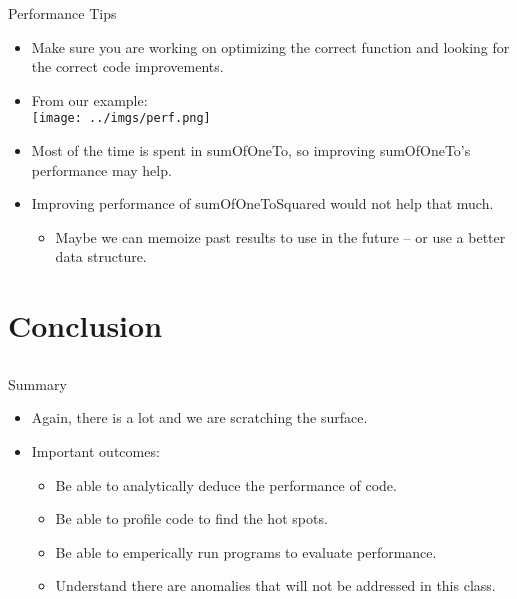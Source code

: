 \documentclass{beamer}
\begin{document}
\begin{frame}{Performance Tips}
\begin{itemize}
\item Make sure you are working on optimizing the correct function and looking for the correct code improvements.
\item From our example:\\
\texttt{[image: ../imgs/perf.png]}
\item Most of the time is spent in sumOfOneTo, so improving sumOfOneTo's performance may help.
\item Improving performance of sumOfOneToSquared would not help that much.
\begin{itemize}
\item Maybe we can memoize past results to use in the future -- or use a better data structure.
\end{itemize}
\end{itemize}
\end{frame}

\section{Conclusion}
\subsection{}

\begin{frame}{Summary}
\begin{itemize}
\item Again, there is a lot and we are scratching the surface.
\item Important outcomes:
\begin{itemize}
\item Be able to analytically deduce the performance of code.
\item Be able to profile code to find the hot spots.
\item Be able to emperically run programs to evaluate performance.
\item Understand there are anomalies that will not be addressed in this class.
\end{itemize}
\end{itemize}
\end{frame}
\end{document}
